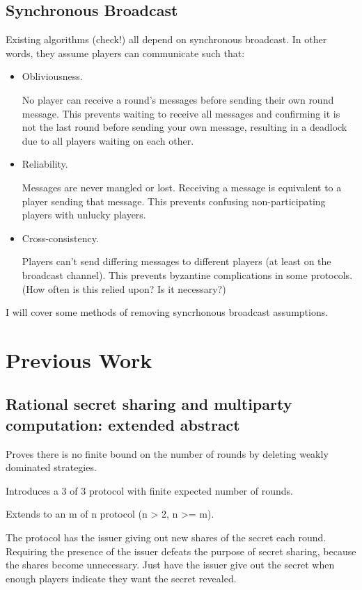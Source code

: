 \documentclass{article}
\begin{document}
\subsection{Synchronous Broadcast}
Existing algorithms (check!) all depend on synchronous broadcast. In other words, they assume players can communicate such that:
\begin{itemize}
\item Obliviousness.

	No player can receive a round's messages before sending their own round message. This prevents waiting to receive all messages and confirming it is not the last round before sending your own message, resulting in a deadlock due to all players waiting on each other.

\item Reliability.

	Messages are never mangled or lost. Receiving a message is equivalent to a player sending that message. This prevents confusing non-participating players with unlucky players.

\item Cross-consistency.

	Players can't send differing messages to different players (at least on the broadcast channel). This prevents byzantine complications in some protocols. (How often is this relied upon? Is it necessary?)
\end{itemize}

I will cover some methods of removing syncrhonous broadcast assumptions.

\section{Previous Work}
\subsection{Rational secret sharing and multiparty computation: extended abstract}
Proves there is no finite bound on the number of rounds by deleting weakly dominated strategies.

Introduces a 3 of 3 protocol with finite expected number of rounds.

Extends to an m of n protocol (n > 2, n >= m).

The protocol has the issuer giving out new shares of the secret each round. Requiring the presence of the issuer defeats the purpose of secret sharing, because the shares become unnecessary. Just have the issuer give out the secret when enough players indicate they want the secret revealed.
\end{document}
